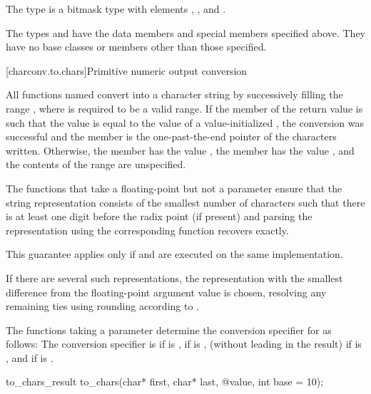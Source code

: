 \pnum
The type  is a bitmask type
with elements , , and .

\pnum
The types  and 
have the data members and special members specified above.
They have no base classes or members other than those specified.

[charconv.to.chars]{Primitive numeric output conversion}

\pnum
All functions named 
convert  into a character string
by successively filling the range
,
where  is required to be a valid range.
If the member 
of the return value
is such that the value
is equal to the value of a value-initialized ,
the conversion was successful
and the member 
is the one-past-the-end pointer of the characters written.
Otherwise,
the member  has the value ,
the member  has the value ,
and the contents of the range  are unspecified.

\pnum
The functions that take a floating-point 
but not a  parameter
ensure that the string representation
consists of the smallest number of characters
such that
there is at least one digit before the radix point (if present) and
parsing the representation using the corresponding  function
recovers  exactly.
\begin{note}
This guarantee applies only if
 and 
are executed on the same implementation.
\end{note}
If there are several such representations,
the representation with the smallest difference from
the floating-point argument value is chosen,
resolving any remaining ties using rounding according to
.

\pnum
The functions taking a  parameter
determine the conversion specifier for  as follows:
The conversion specifier is
 if  is ,
 if  is ,
 (without leading  in the result)
if  is ,
and
 if  is .

%
\begin{itemdecl}
to_chars_result to_chars(char* first, char* last, @\seebelow@ value, int base = 10);
\end{itemdecl}

